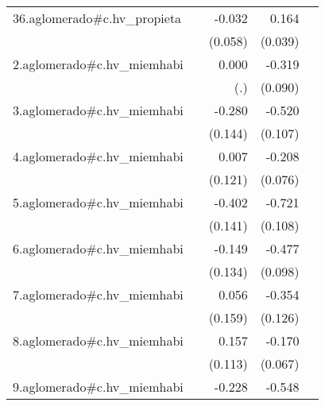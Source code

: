 {\begin{longtable}{l*{4}{D{.}{.}{-1}}}
\addlinespace
36.aglomerado#c.hv\_propieta&                     &      -0.032         &       0.164\sym{***}&                     \\
            &                     &     (0.058)         &     (0.039)         &                     \\
\addlinespace
2.aglomerado#c.hv\_miemhabi&                     &       0.000         &      -0.319\sym{***}&                     \\
            &                     &         (.)         &     (0.090)         &                     \\
\addlinespace
3.aglomerado#c.hv\_miemhabi&                     &      -0.280         &      -0.520\sym{***}&                     \\
            &                     &     (0.144)         &     (0.107)         &                     \\
\addlinespace
4.aglomerado#c.hv\_miemhabi&                     &       0.007         &      -0.208\sym{**} &                     \\
            &                     &     (0.121)         &     (0.076)         &                     \\
\addlinespace
5.aglomerado#c.hv\_miemhabi&                     &      -0.402\sym{**} &      -0.721\sym{***}&                     \\
            &                     &     (0.141)         &     (0.108)         &                     \\
\addlinespace
6.aglomerado#c.hv\_miemhabi&                     &      -0.149         &      -0.477\sym{***}&                     \\
            &                     &     (0.134)         &     (0.098)         &                     \\
\addlinespace
7.aglomerado#c.hv\_miemhabi&                     &       0.056         &      -0.354\sym{**} &                     \\
            &                     &     (0.159)         &     (0.126)         &                     \\
\addlinespace
8.aglomerado#c.hv\_miemhabi&                     &       0.157         &      -0.170\sym{*}  &                     \\
            &                     &     (0.113)         &     (0.067)         &                     \\
\addlinespace
9.aglomerado#c.hv\_miemhabi&                     &      -0.228         &      -0.548\sym{***}&                     \\

\end{longtable}}
